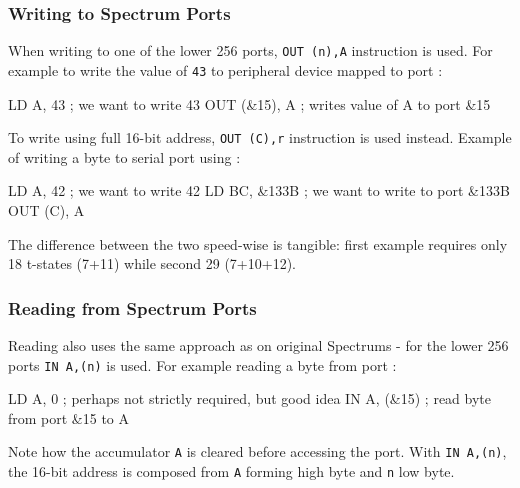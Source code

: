 
\subsubsection{Writing to Spectrum Ports}

When writing to one of the lower 256 ports, {\tt OUT (n),A} instruction is used. For example to write the value of {\tt 43} to peripheral device mapped to port :

\begin{tcblisting}{}
    LD A, 43            ; we want to write 43
    OUT (&15), A        ; writes value of A to port &15
\end{tcblisting}

To write using full 16-bit address, {\tt OUT (C),r} instruction is used instead. Example of writing a byte to serial port using :

\begin{tcblisting}{}
    LD A, 42            ; we want to write 42
    LD BC, &133B        ; we want to write to port &133B
    OUT (C), A
\end{tcblisting}

The difference between the two speed-wise is tangible: first example requires only 18 t-states (7+11) while second 29 (7+10+12).


\subsubsection{Reading from Spectrum Ports}

Reading also uses the same approach as on original Spectrums - for the lower 256 ports {\tt IN A,(n)} is used. For example reading a byte from port :

\begin{tcblisting}{}
    LD A, 0       ; perhaps not strictly required, but good idea
    IN A, (&15)   ; read byte from port &15 to A
\end{tcblisting}

Note how the accumulator {\tt A} is cleared before accessing the port. With {\tt IN A,(n)}, the 16-bit address is composed from {\tt A} forming high byte and {\tt n} low byte.

